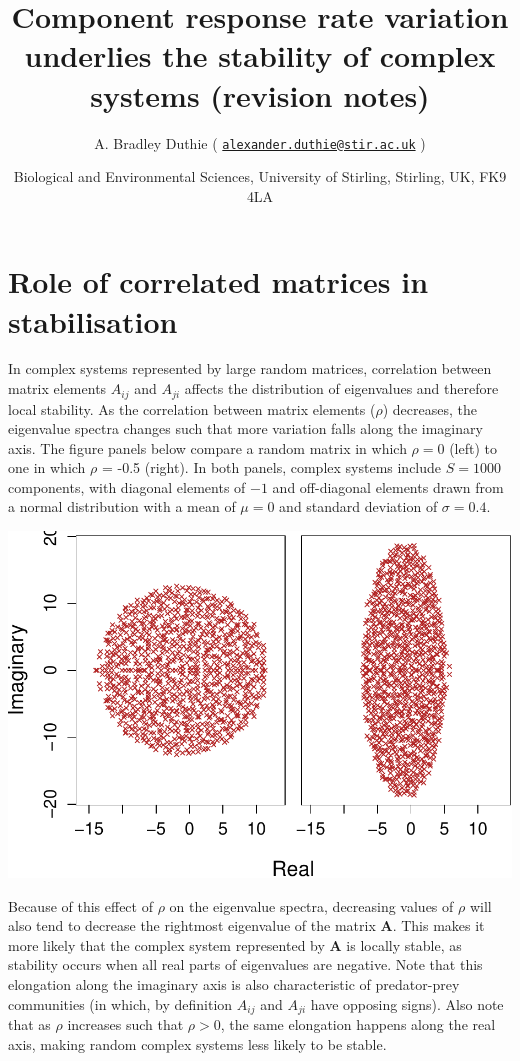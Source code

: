 \documentclass[]{article}
\title{Component response rate variation underlies the stability of complex
systems (revision notes)}
\author{A. Bradley Duthie (
\href{mailto:alexander.duthie@stir.ac.uk}{\nolinkurl{alexander.duthie@stir.ac.uk}}
)}
\date{Biological and Environmental Sciences, University of Stirling, Stirling,
UK, FK9 4LA}
\begin{document}
\maketitle

\section{Role of correlated matrices in
stabilisation}\label{role-of-correlated-matrices-in-stabilisation}

In complex systems represented by large random matrices, correlation
between matrix elements \(A_{ij}\) and \(A_{ji}\) affects the
distribution of eigenvalues and therefore local stability. As the
correlation between matrix elements (\(\rho\)) decreases, the eigenvalue
spectra changes such that more variation falls along the imaginary axis.
The figure panels below compare a random matrix in which \(\rho = 0\)
(left) to one in which \(\rho\) = -0.5 (right). In both panels, complex
systems include \(S = 1000\) components, with diagonal elements of
\(-1\) and off-diagonal elements drawn from a normal distribution with a
mean of \(\mu = 0\) and standard deviation of \(\sigma = 0.4\).

\includegraphics{revision_notes_files/figure-latex/unnamed-chunk-2-1.pdf}

Because of this effect of \(\rho\) on the eigenvalue spectra, decreasing
values of \(\rho\) will also tend to decrease the rightmost eigenvalue
of the matrix \(\textbf{A}\). This makes it more likely that the complex
system represented by \(\textbf{A}\) is locally stable, as stability
occurs when all real parts of eigenvalues are negative. Note that this
elongation along the imaginary axis is also characteristic of
predator-prey communities (in which, by definition \(A_{ij}\) and
\(A_{ji}\) have opposing signs). Also note that as \(\rho\) increases
such that \(\rho > 0\), the same elongation happens along the real axis,
making random complex systems less likely to be stable.
\end{document}
